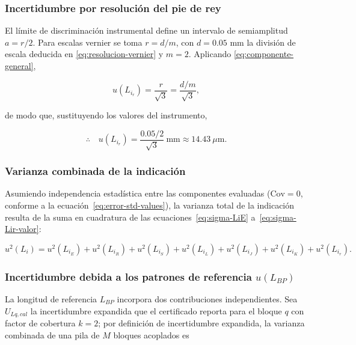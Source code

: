 \subsubsection*{Incertidumbre por resolución del pie de rey}

El límite de discriminación instrumental define un intervalo de semiamplitud $a = r/2$.
Para escalas vernier se toma $r = d/m$, con $d = 0.05$ mm la división de escala
deducida en \eqref{eq:resolucion-vernier} y $m = 2$. Aplicando
\eqref{eq:componente-general},

\begin{equation}
    u(L_{i_r}) = \frac{r}{\sqrt{3}} = \frac{d / m}{\sqrt{3}} ,
    \label{eq:sigma-Lir}
\end{equation}

de modo que, sustituyendo los valores del instrumento,

\begin{equation}
    \therefore\quad u(L_{i_r}) =
    \frac{0.05/2}{\sqrt{3}}\ \text{mm} \approx 14.43\ \mu\text{m}.
    \label{eq:sigma-Lir-valor}
\end{equation}

\subsubsection*{Varianza combinada de la indicación}

Asumiendo independencia estadística entre las componentes evaluadas
($\text{Cov} = 0$, conforme a la ecuación~\eqref{eq:error-std-values}), la varianza
total de la indicación resulta de la suma en cuadratura de las
ecuaciones~\eqref{eq:sigma-LiE} a~\eqref{eq:sigma-Lir-valor}:

\begin{equation}
    u^2(L_i) = u^2(L_{i_E}) + u^2(L_{i_R}) + u^2(L_{i_S})
    + u^2(L_{i_L}) + u^2(L_{i_J}) + u^2(L_{i_K}) + u^2(L_{i_r}).
    \label{eq:sigma-Li-total}
\end{equation}

\subsubsection{Incertidumbre debida a los patrones de referencia \texorpdfstring{$u(L_{BP})$}{sigma(LBP)}}

La longitud de referencia $L_{BP}$ incorpora dos contribuciones independientes. Sea
$U_{Lq,cal}$ la incertidumbre expandida que el certificado reporta para el bloque $q$
con factor de cobertura $k = 2$; por definición de incertidumbre expandida, la
varianza combinada de una pila de $M$ bloques acoplados es

